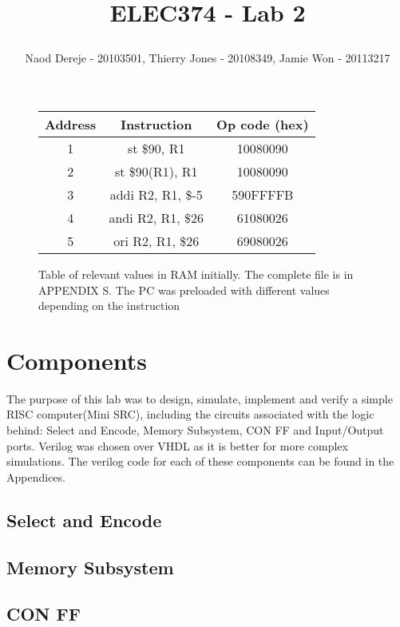 \documentclass{article}
\title{
    \begin{large}
        ELEC374 - Lab 2
    \end{large}
}
\author{Naod Dereje - 20103501, Thierry Jones - 20108349, Jamie Won - 20113217}
\begin{document}
\maketitle
\cleardoublepage
\tableofcontents
\cleardoublepage


\begin{figure}
    \begin{tabular}{|c|c|c|}
        \hline
        Address & Instruction & Op code (hex) \\
        \hline
        1 & st \$90, R1 & 10080090 \\
        \hline
        2 & st \$90(R1), R1 & 10080090 \\
        \hline
        3 & addi R2, R1, \$-5 & 590FFFFB \\
        \hline
        4 & andi R2, R1, \$26 & 61080026 \\
        \hline
        5 & ori R2, R1, \$26 & 69080026 \\
        \hline
    \end{tabular}
    \caption{Table of relevant values in RAM initially. The complete file is in APPENDIX S. The PC was preloaded with different values depending on the instruction}
\end{figure}


\section{Components}
    The purpose of this lab was to design, simulate, implement and verify a simple RISC computer(Mini SRC), including the circuits associated with the logic behind: 
    Select and Encode, Memory Subsystem, CON FF and Input/Output ports. Verilog was chosen over VHDL as it is better for more complex simulations. The verilog code 
    for each of these components can be found in the Appendices.
    
    \subsection{Select and Encode}


    \subsection{Memory Subsystem}
    

    \subsection{CON FF}
    
\end{document}
